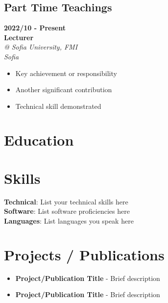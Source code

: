 \documentclass[11pt,a4paper]{article}
\makeatletter
\newcommand{\workblock}[5]{
    \noindent \textbf{#1} \\
    \textbf{#2} \\
    \textit{@ #3} \\
    \textit{#4} \\
    #5
}
\newcommand{\skillgroup}[2]{
    \textbf{#1}: #2 \\
}
\makeatother
\begin{document}
\begin{multicols}{3}
    \columnbreak
    
    \subsection{Part Time Teachings}
    \workblock{2022/10 - Present}{Lecturer}
    {Sofia University, FMI}{Sofia}{
        \begin{itemize}
            \item Key achievement or responsibility
            \item Another significant contribution
            \item Technical skill demonstrated
        \end{itemize}
    }
\end{multicols}


\section{Education}

\section{Skills}
\skillgroup{Technical}{List your technical skills here}
\skillgroup{Software}{List software proficiencies here}
\skillgroup{Languages}{List languages you speak here}

\section{Projects / Publications}
\begin{itemize}[leftmargin=*]
    \item \textbf{Project/Publication Title} - Brief description
    \item \textbf{Project/Publication Title} - Brief description
\end{itemize}
\end{document}
